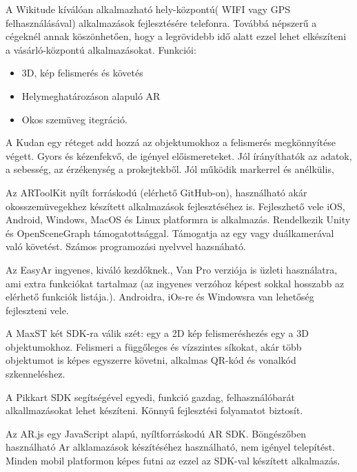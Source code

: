 
A Wikitude kíválóan alkalmazható hely-központú( WIFI vagy GPS felhasználásával) alkalmazások fejlesztésére telefonra. Továbbá népszerű a cégeknél annak köszönhetően, hogy a legrövidebb idő alatt ezzel lehet elkészíteni a vásárló-központú alkalmazásokat. Funkciói:
\begin{itemize}
\item 3D, kép felismerés és követés 
\item Helymeghatározáson alapuló AR
\item Okos szemüveg itegráció.
\end{itemize}


A Kudan egy réteget add hozzá az objektumokhoz a felismerés megkönnyítése végett. Gyors és kézenfekvő, de igényel előismereteket. Jól írányíthatók az adatok, a sebesség, az érzékenység a prokejtekből. Jól működik markerrel és anélkülis, 


Az ARToolKit nyílt forráskodú (elérhető GitHub-on), használható akár okosszemüvegekhez készített alkalmazások fejlesztéséhez is. Fejleszhető vele iOS, Android, Windows, MacOS és Linux platformra is alkalmazás. Rendelkezik Unity és OpenSceneGraph támogatottsággal. Támogatja az egy vagy duálkamerával való követést. Számos programozási nyelvvel hazsnáható.


Az EasyAr ingyenes, kiváló kezdőknek., Van Pro verziója is üzleti használatra, ami extra funkciókat tartalmaz (az ingyenes verzóhoz képest sokkal hosszabb az elérhető funkciók listája.). Androidra, iOs-re és Windowsra van lehetőség fejleszteni vele.


A MaxST két SDK-ra válik szét: egy a 2D kép felismeréshezés egy a 3D objektumokhoz. Felismeri a függőleges és vízszintes síkokat, akár több objektumot is képes egyszerre követni, alkalmas QR-kód és vonalkód szkenneléshez.


A Pikkart SDK segítségével egyedi, funkció gazdag, felhasználóbarát alkallmazásokat lehet készíteni. Könnyű fejlesztési folyamatot biztosít.

Az AR.js egy JavaScript alapú, nyíltforráskodú AR SDK. Böngészőben használható Ar alklamazások készítéséhez használható, nem igényel telepítést. Minden mobil platformon képes futni az ezzel az SDK-val készített alkalmazás.

